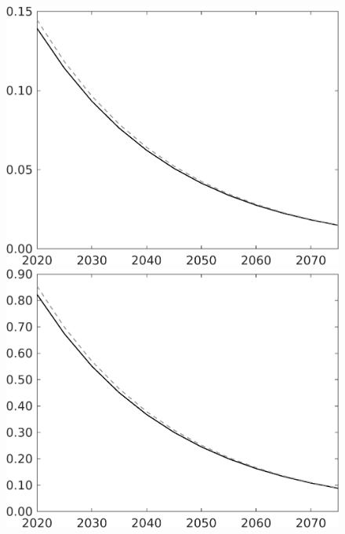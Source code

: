 \documentclass[12pt]{article}
\begin{document}
\begin{figure}[h!!]
\begin{minipage}[]{0.32\textwidth}
\end{minipage}	
\begin{minipage}[]{0.32\textwidth}
	\includegraphics[width=1\textwidth]{../../codding_model/own_basedOnFried/optimalPol_010922_revision/figures/all_13Sept22/LevTaufNoTauf_TaulCalib_Equlab_regime0_pf_spillover0_nsk1_xgr1_knspil1_sep1_LFlimit0_emsbase0_countec0_GovRev0_etaa0.79_lgd0.png}
\end{minipage}	
\begin{minipage}[]{0.32\textwidth}
\includegraphics[width=1\textwidth]{../../codding_model/own_basedOnFried/optimalPol_010922_revision/figures/all_13Sept22/LevTaufNoTauf_TaulCalib_Equlab_regime0_pg_spillover0_nsk1_xgr1_knspil1_sep1_LFlimit0_emsbase0_countec0_GovRev0_etaa0.79_lgd0.png}

\end{minipage}
\end{figure}
\end{document}
